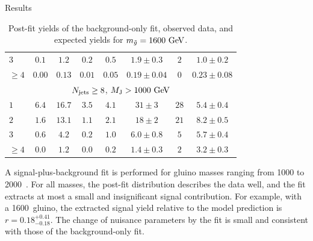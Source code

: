 \begin{section}{Results}
\begin{table}
\begin{tabular}[tbp!]{ l | c  c  c  c | c |  c | c  }
$3$      & $0.1$  & $1.2$   & $0.2$  & $0.5$  & $1.9\pm0.3$   & $2$    & $1.0 \pm 0.2$   \\
$\geq 4$ & $0.00$ & $0.13$  & $0.01$ & $0.05$ & $0.19\pm0.04$ & $0$    & $0.23 \pm 0.08$ \\
\hline
\multicolumn{8}{c}{$N_{\mathrm{jets}} \geq 8$, $M_\mathrm{J} > 1000~\mathrm{Ge\kern -0.1em V}$} \\
\hline
$1$      & $6.4$  & $16.7$  & $3.5$  & $4.1$  & $31\pm3$      & $28$   & $5.4 \pm 0.4$   \\
$2$      & $1.6$  & $13.1$  & $1.1$  & $2.1$  & $18\pm2$      & $21$   & $8.2 \pm 0.5$   \\
$3$      & $0.6$  & $4.2$   & $0.2$  & $1.0$  & $6.0\pm0.8$   & $5$    & $5.7 \pm 0.4$   \\
$\geq 4$ & $0.0$  & $1.2$   & $0.0$  & $0.2$  & $1.4\pm0.3$   & $2$    & $3.2 \pm 0.3$   \\
\hline
\end{tabular}
\caption{Post-fit yields of the background-only fit, observed data, and expected yields for $m_{\tilde{g}} = 1600~\mathrm{Ge\kern -0.1em V}$.}
\label{tab:fit_bonly_yields}
\end{table}

A signal-plus-background fit is performed for gluino masses ranging from 1000 to 2000~\GeV.
For all masses, the post-fit \Nb distribution describes the data well, and the fit extracts at most a small and insignificant signal contribution.
For example, with a 1600~\GeV gluino, the extracted signal yield relative to the model prediction is $r=0.18^{+0.41}_{-0.18}$.
The change of nuisance parameters by the fit is small and consistent with those of the background-only fit.

\end{section}

